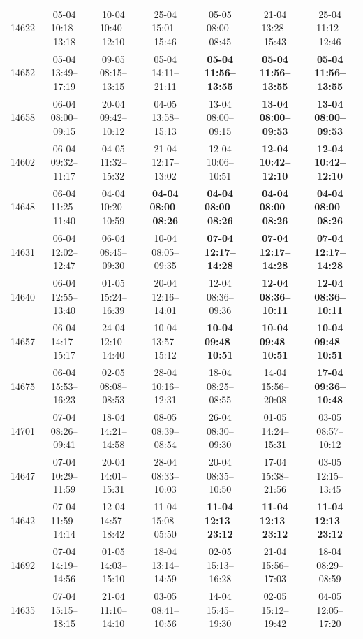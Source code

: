 \begin{table}[htbp]
\begin{tabular}{|r|c|c|c|c|c|c|}
14622 & 05-04 10:18--13:18 & 10-04 10:40--12:10 & 25-04 15:01--15:46 & 05-05 08:00--08:45 & 21-04 13:28--15:43 & 25-04 11:12--12:46 \\ 
14652 & 05-04 13:49--17:19 & 09-05 08:15--13:15 & 05-04 14:11--21:11 & \textbf{05-04 11:56--13:55} & \textbf{05-04 11:56--13:55} & \textbf{05-04 11:56--13:55} \\ 
14658 & 06-04 08:00--09:15 & 20-04 09:42--10:12 & 04-05 13:58--15:13 & 13-04 08:00--09:15 & \textbf{13-04 08:00--09:53} & \textbf{13-04 08:00--09:53} \\ 
14602 & 06-04 09:32--11:17 & 04-05 11:32--15:32 & 21-04 12:17--13:02 & 12-04 10:06--10:51 & \textbf{12-04 10:42--12:10} & \textbf{12-04 10:42--12:10} \\ 
14648 & 06-04 11:25--11:40 & 04-04 10:20--10:59 & \textbf{04-04 08:00--08:26} & \textbf{04-04 08:00--08:26} & \textbf{04-04 08:00--08:26} & \textbf{04-04 08:00--08:26} \\ 
14631 & 06-04 12:02--12:47 & 06-04 08:45--09:30 & 10-04 08:05--09:35 & \textbf{07-04 12:17--14:28} & \textbf{07-04 12:17--14:28} & \textbf{07-04 12:17--14:28} \\ 
14640 & 06-04 12:55--13:40 & 01-05 15:24--16:39 & 20-04 12:16--14:01 & 12-04 08:36--09:36 & \textbf{12-04 08:36--10:11} & \textbf{12-04 08:36--10:11} \\ 
14657 & 06-04 14:17--15:17 & 24-04 12:10--14:40 & 10-04 13:57--15:12 & \textbf{10-04 09:48--10:51} & \textbf{10-04 09:48--10:51} & \textbf{10-04 09:48--10:51} \\ 
14675 & 06-04 15:53--16:23 & 02-05 08:08--08:53 & 28-04 10:16--12:31 & 18-04 08:25--08:55 & 14-04 15:56--20:08 & \textbf{17-04 09:36--10:48} \\ 
14701 & 07-04 08:26--09:41 & 18-04 14:21--14:58 & 08-05 08:39--08:54 & 26-04 08:30--09:30 & 01-05 14:24--15:31 & 03-05 08:57--10:12 \\ 
14647 & 07-04 10:29--11:59 & 20-04 14:01--15:31 & 28-04 08:33--10:03 & 20-04 08:35--10:50 & 17-04 15:38--21:56 & 03-05 12:15--13:45 \\ 
14642 & 07-04 11:59--14:14 & 12-04 14:57--18:42 & 11-04 15:08--05:50 & \textbf{11-04 12:13--23:12} & \textbf{11-04 12:13--23:12} & \textbf{11-04 12:13--23:12} \\ 
14692 & 07-04 14:19--14:56 & 01-05 14:03--15:10 & 18-04 13:14--14:59 & 02-05 15:13--16:28 & 21-04 15:56--17:03 & 18-04 08:29--08:59 \\ 
14635 & 07-04 15:15--18:15 & 21-04 11:10--14:10 & 03-05 08:41--10:56 & 14-04 15:45--19:30 & 02-05 15:12--19:42 & 04-05 12:05--17:20 \\ 

\end{tabular}
\end{table}
